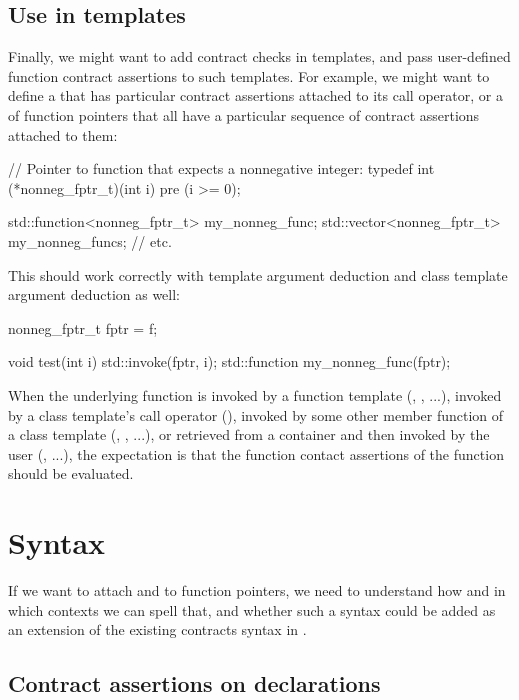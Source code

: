 \subsection{Use in templates}
\label{usecase_templates}
Finally, we might want to add contract checks in templates, and pass user-defined function contract assertions to such templates. For example, we might want to define a  that has particular contract assertions attached to its call operator, or a  of function pointers that all have a particular sequence of contract assertions attached to them:
\begin{codeblock}
// Pointer to function that expects a nonnegative integer:
typedef int (*nonneg_fptr_t)(int i) pre (i >= 0);

std::function<nonneg_fptr_t> my_nonneg_func;
std::vector<nonneg_fptr_t>   my_nonneg_funcs;
// etc.
\end{codeblock}
This should work correctly with template argument deduction and class template argument deduction as well:
\begin{codeblock}
nonneg_fptr_t fptr = f;

void test(int i) {
  std::invoke(fptr, i);
  std::function my_nonneg_func(fptr);
}
\end{codeblock}
When the underlying function is invoked by a function template (, , ...), invoked by a class template's call operator (), invoked by some other member function of a class template (, , ...), or retrieved from a container and then invoked by the user (, ...), the expectation is that the function contact assertions of the function should be evaluated.



\section{Syntax}
\label{syntax}

If we want to attach  and  to function pointers, we need to understand how and in which contexts we can spell that, and whether such a syntax could be added as an extension of the existing contracts syntax in \cite{P2900R8}.

\subsection{Contract assertions on declarations}

